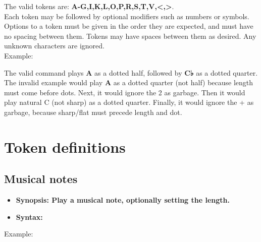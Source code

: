 The valid tokens are: {\ttfamily\bfseries A-G,I,K,L,O,P,R,S,T,V,<,>}.\\

Each token may be followed by optional modifiers such as numbers or symbols.
Options to a token must be given in the order they are expected, and must have
no spacing between them. Tokens may have spaces between them as desired. Any
unknown characters are ignored.\\

Example:\\


The valid command plays {\ttfamily\bfseries A} as a dotted half, followed by
{\ttfamily\bfseries C♭} as a dotted quarter.\\

The invalid example would play {\ttfamily\bfseries A} as a dotted quarter (not
half) because length must come before dots. Next, it would ignore the 2 as
garbage. Then it would play natural C (not sharp) as a dotted quarter. Finally,
it would ignore the + as garbage, because sharp/flat must precede length and
dot.\\

\section{Token definitions}

\subsection{Musical notes}

\begin{itemize}

	\item \bfseries{Synopsis}: Play a musical note, optionally setting the length.

	\item \bfseries{Syntax}: {\ttfamily <A-G>[<+/->][<length>][.]}

\end{itemize}

\vspace{16pt}

Example:\\

